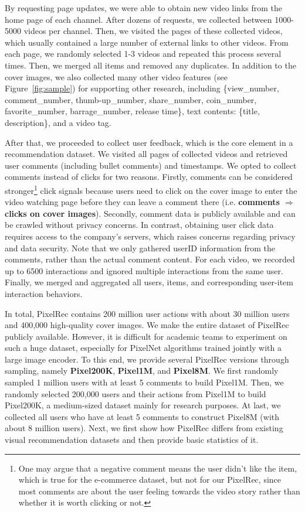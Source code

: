 \documentclass[sigconf]{acmart}
\begin{document}
By requesting page updates, we were able to obtain new video links from the home page of each channel. After dozens of requests, we collected between  1000-5000 videos per channel. Then, we  visited  the  pages of these collected videos, which usually contained a large number of external links to other videos. From each page, we randomly selected 1-3 videos and repeated this process several times. Then, we merged all items and removed any duplicates.
In addition to the cover images, we also collected many other video features (see Figure~\ref{fig:sample}) for supporting other research, including \{view\_number, comment\_number, thumb-up\_number, share\_number, coin\_number, favorite\_number,  barrage\_number, release time\}, text contents: \{title, description\}, and a video tag.

 
After that, we proceeded  to collect user feedback, which is the core element in a recommendation dataset. We visited all pages of  collected videos and retrieved user comments (including bullet comments) and timestamps. We opted to collect comments instead of clicks for two reasons. Firstly, comments can be considered  stronger\footnote{One may argue that a negative comment means the user didn't like the item, which is true for the e-commerce dataset, but not for our PixelRec, since most comments are about the user feeling towards  the video story rather than whether it is worth clicking or not.} click signals because users need to  click on the cover image to enter the video watching page before they can leave a comment there (i.e. \textbf{comments $\Rightarrow$  clicks on cover images}). Secondly, comment data is publicly available and can be crawled without privacy concerns. In contrast, obtaining user click data requires access to the company's servers, which raises concerns regarding privacy and data security. Note that we only gathered userID information from the comments, rather than the actual comment content.
 For each video, we recorded up to 6500 interactions and ignored multiple interactions from the same user. 
Finally, we merged and aggregated all users, items, and corresponding user-item interaction behaviors.

	

In total, PixelRec contains 200 million user  actions with about 30 million users and 400,000 high-quality  cover images. We make the entire dataset of PixelRec publicly available. However, it is difficult for academic teams  to experiment on such a huge dataset, especially for PixelNet algorithms  trained jointly with a large image encoder. 
 To this end, we provide several PixelRec versions through sampling, namely \textbf{Pixel200K}, \textbf{Pixel1M}, and \textbf{Pixel8M}. 
 We first randomly sampled 1 million users with at least 5 comments to  build Pixel1M. Then, we randomly selected 200,000 users and their actions from Pixel1M to build Pixel200K,  a medium-sized dataset mainly for research purposes. At last, we collected all users who have at least  5 comments to construct Pixel8M  (with about 8 million users).
Next, we first show how PixelRec differs from existing visual recommendation datasets and then provide basic statistics of it.
\end{document}
